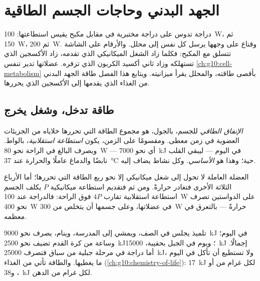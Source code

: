 \chapter{الجهد البدني وحاجات الجسم الطاقية}\label{ch:g10:exercise-and-energy}

دراجة تدوس على دراجة مختبرية في مقابل مكبح يقيس استطاعتها:
\qty{100}{W}، ثم \qty{150}{W}، ثم \qty{200}{W}. وقناع على وجهها يرسل
كل نفس إلى محلل. والأرقام على الشاشة تتسلق مع المكبح: فكلما زاد الشغل
الميكانيكي الذي تقدمه، زاد الأكسجين الذي تستهلكه وزاد ثاني أكسيد
الكربون الذي تزفره. عضلاتها تدير تنفس
\cref{ch:g10:cell-metabolism} بأقصى طاقته، والمحلل يقرأ ميزانيته.
ويتابع هذا الفصل طاقة الجهد البدني من الغذاء الذي يقدمها إلى الأكسجين
الذي يحررها.

\section{طاقة تدخل، وشغل يخرج}

\begin{definition}\label{def:g10:exercise-and-energy:expenditure}
\emph{الإنفاق الطاقي} للجسم، بالجول، هو مجموع الطاقة
التي تحررها خلاياه من الجزيئات العضوية في زمن معطى. ومقسومًا على
الزمن، يكون \emph{استطاعة استقلابية}، بالواط. ويصرف البالغ في الراحة
نحو \qty{80}{W} --- أي نحو \qty{7000}{kJ} في اليوم --- ليبقي القلب
نابضًا والدماغ عاملًا والحرارة عند \qty{37}{\celsius}  حية؛
وهذا هو \emph{ الأساسي}. وكل نشاط يضاف إليه.
\end{definition}

\begin{proposition}\label{prop:g10:exercise-and-energy:efficiency}
العضلة العاملة لا تحول إلى شغل ميكانيكي إلا نحو ربع الطاقة التي
تحررها؛ أما الأرباع الثلاثة الأخرى فتغادر حرارةً. ومن ثم فتقديم
استطاعة ميكانيكية $P$ يكلف الجسم استطاعة استقلابية تقارب $4P$ فوق
الراحة: فالدراجة عند \qty{100}{W} على الدواستين تصرف نحو
\qty{400}{W} في عضلاتها، وعلى جسمها أن يتخلص من \qty{300}{W} حرارةً
--- بالتعرق في معظمه.
\end{proposition}
\admitted

\begin{example}\label{ex:g10:exercise-and-energy:budgets}
تلميذ يجلس في الصف، ويمشي إلى المدرسة، وينام، يصرف نحو \qty{9000}{kJ}
في اليوم؛ وساعة من كرة القدم تضيف نحو \qty{2500}{kJ}؛ ويوم في الجبل
بحقيبة، \qty{15000}{kJ} إجمالًا. أما دراجة في مرحلة جبلية من سباق
فتصرف \qty{25000}{kJ}، ولا تستطيع أن تأكل في اليوم ما يغطيها. والطاقة
تأتي من الغذاء (\cref{ch:g10:chemistry-of-life}): \qty{17}{kJ} لكل
غرام من  أو ، و\qty{38}{kJ} لكل غرام من الدهن.
\end{example}

